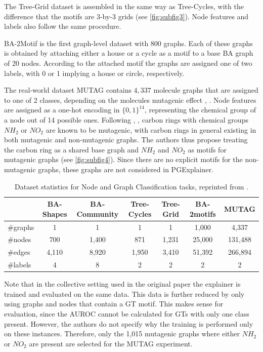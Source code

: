 The Tree-Grid dataset is assembled in the same way as Tree-Cycles, with the difference that the motifs are 3-by-3 grids (see \ref{fig:subfig3}). Node features and labels also follow the same procedure.

BA-2Motif is the first graph-level dataset with 800 graphs. Each of these graphs is obtained by attaching either a house or a cycle as a motif to a base BA graph of 20 nodes. According to the attached motif the graphs are assigned one of two labels, with 0 or 1 implying a house or circle, respectively.

The real-world dataset MUTAG contains $4,337$ molecule graphs that are assigned to one of 2 classes, depending on the molecules mutagenic effect \cite{riesen2008iam}, \cite{ying2019gnnexplainer}. Node features are assigned as a one-hot encoding in $\{0,1\}^{14}$, representing the chemical group of a node out of 14 possible ones. Following \cite{debnath1991structure}, \cite{ying2019gnnexplainer}, carbon rings with chemical groups $NH_2$ or $NO_2$ are known to be mutagenic, with carbon rings in general existing in both mutagenic and non-mutagenic graphs. The authors thus propose treating the carbon ring as a shared base graph and $NH_2$ and $NO_2$ as motifs for mutagenic graphs (see \ref{fig:subfig4}). Since there are no explicit motifs for the non-mutagenic graphs, these graphs are not considered in PGExplainer.

\begin{table}[h]
    \centering
    \scriptsize
    \begin{tabular}{l|cccc|cc}
    \hline
    \textbf{} & \textbf{BA-Shapes} & \textbf{BA-Community} & \textbf{Tree-Cycles} & \textbf{Tree-Grid} & \textbf{BA-2motifs} & \textbf{MUTAG} \\
    \hline
    \#graphs & 1 & 1 & 1 & 1 & 1,000 & 4,337 \\
    \#nodes  & 700 & 1,400 & 871 & 1,231 & 25,000 & 131,488 \\
    \#edges  & 4,110 & 8,920 & 1,950 & 3,410 & 51,392 & 266,894 \\
    \#labels & 4 & 8 & 2 & 2 & 2 & 2 \\
    \hline
    \end{tabular}
    \caption[Statistics of PGExplainer datasets]{Dataset statistics for Node and Graph Classification tasks, reprinted from \cite{luo2020parameterized}.}
    \label{tab:dataset-statistics}
\end{table}

Note that in the collective setting used in the original paper the explainer is trained and evaluated on the same data. This data is further reduced by only using graphs and nodes that contain a \ac{GT} motif. This makes sense for evaluation, since the AUROC cannot be calculated for \acp{GT} with only one class present. However, the authors do not specify why the training is performed only on these instances. Therefore, only the 1,015 mutagenic graphs where either $NH_2$ or $NO_2$ are present are selected for the MUTAG experiment. \bigskip

